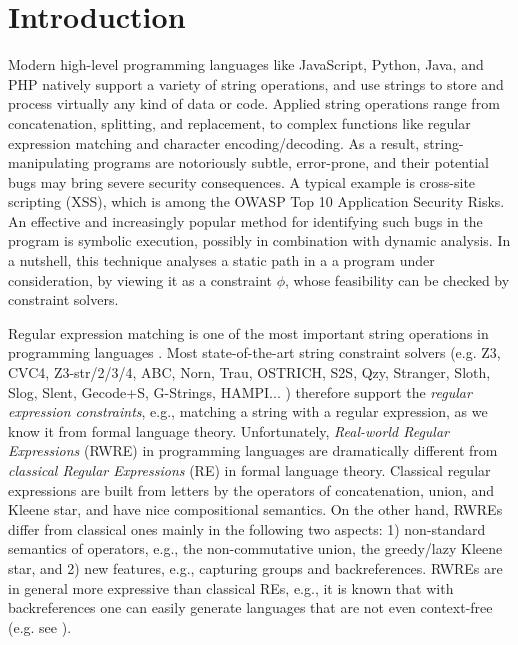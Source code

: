 
\section{Introduction}



%
Modern high-level programming languages like JavaScript, Python, Java,
and PHP natively support a variety of string operations, and use
strings to store and process virtually any kind of data or code.
Applied string operations range from concatenation, splitting, and
replacement, to complex functions like regular expression matching and
character
encoding/decoding.  As a result, string-manipulating programs are
notoriously subtle, error-prone, and their potential bugs may bring
severe security consequences. A typical example is cross-site
scripting (XSS), which is among the OWASP Top 10 Application Security
Risks.
An effective and increasingly popular method for identifying such bugs
in the program is symbolic execution, possibly in combination with dynamic
analysis. In a nutshell, this technique analyses a static path in a
a program under consideration, by viewing it as a constraint $\phi$, whose 
feasibility can be checked by constraint solvers.

Regular expression matching is one of the most important string operations
in programming languages \cite{Berkeley-JavaScript,BM17,LMK19,HAMPI}.
Most state-of-the-art string constraint solvers (e.g.
Z3, CVC4, Z3-str/2/3/4, ABC, Norn, Trau, OSTRICH, S2S, Qzy, Stranger, Sloth, Slog, Slent, Gecode+S, G-Strings, HAMPI... ) therefore support
the \emph{regular expression constraints}, e.g., matching a string with a 
regular expression, as we know it from formal language theory. Unfortunately, 
\emph{Real-world Regular Expressions} (RWRE) in programming languages are dramatically different from 
\emph{classical Regular Expressions} (RE) in formal language theory. 
Classical regular expressions are built from letters by the operators of
concatenation, union, and Kleene star, and have nice compositional semantics. On
the other hand, RWREs differ from classical ones mainly in the following two 
aspects: 1) non-standard semantics of 
operators, e.g., the non-commutative union, the greedy/lazy Kleene star, and 2) new 
features, e.g., capturing groups and backreferences.
RWREs are in general more expressive than classical REs, e.g., it is known that
with backreferences one can easily generate languages that are not even 
context-free (e.g. see \cite{FS19,Aho90,BM17b}). %

